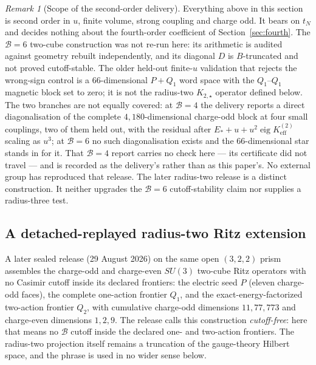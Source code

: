 \documentclass[11pt]{article}
\theoremstyle{plain}
\theoremstyle{definition}
\theoremstyle{remark}
\newtheorem{remark}[theorem]{Remark}
\begin{document}
\begin{remark}[Scope of the second-order delivery]
Everything above in this section is second order in $u$, finite volume, strong
coupling and charge odd. It bears on $t_N$ and decides nothing about the
fourth-order coefficient of Section~\ref{sec:fourth}. The
$\mathcal B=6$ two-cube construction was not re-run here: its arithmetic is
audited against geometry rebuilt independently, and its diagonal $D$ is
$B$-truncated and not proved cutoff-stable. The older held-out finite-$u$
validation that rejects the wrong-sign control is a $66$-dimensional $P+Q_1$
word space with the $Q_1$--$Q_1$ magnetic block set to zero; it is not the
radius-two $K_{2,\star}$ operator defined below. The two branches are not
equally covered: at $\mathcal B=4$ the delivery reports a direct diagonalisation
of the complete $4{,}180$-dimensional charge-odd block at four small couplings,
two of them held out, with the residual after
$E_*+u+u^2\operatorname{eig}K^{(2)}_{\mathrm{eff}}$ scaling as $u^3$; at
$\mathcal B=6$ no such diagonalisation exists and the $66$-dimensional star
stands in for it. That $\mathcal B=4$ report carries no check here --- its
certificate did not travel --- and is recorded as the delivery's rather than as
this paper's. No external group has reproduced that release. The later
radius-two release is a distinct construction. It neither upgrades the
$\mathcal B=6$ cutoff-stability claim nor supplies a radius-three test.
\end{remark}

\subsection{A detached-replayed radius-two Ritz extension}
\label{sec:radius2}

A later sealed release (29 August 2026) on the same open $(3,2,2)$ prism
assembles the charge-odd and charge-even $SU(3)$ two-cube Ritz operators with
no Casimir cutoff inside its declared frontiers: the electric seed $P$ (eleven
charge-odd faces), the complete one-action frontier $Q_1$, and the
exact-energy-factorized two-action frontier $Q_2$, with cumulative charge-odd
dimensions $11,77,773$ and charge-even dimensions $1,2,9$. The release calls
this construction \emph{cutoff-free}: here that means no $\mathcal B$ cutoff
inside the declared one- and two-action frontiers. The radius-two projection
itself remains a truncation of the gauge-theory Hilbert space, and the phrase
is used in no wider sense below.
\end{document}
